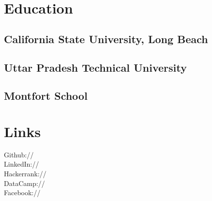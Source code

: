 \documentclass[]{vansh-resume}
\begin{document}


%
%

\begin{minipage}[t]{0.33\textwidth} 


\section{Education} 
\subsection{California State University, Long Beach}
\sectionsep

\subsection{Uttar Pradesh Technical University}
\sectionsep

\subsection{Montfort School}
\sectionsep


\section{Links} 
Github:// \href{https://github.com/vansh2795}{} \\
LinkedIn://  \href{https://www.linkedin.com/in/vansh-bajaj-33a76a146/}{} \\
Hackerrank://  \href{https://www.hackerrank.com/vansh2795}{} \\
DataCamp://  \href{datacamp.com/profile/vanshbajaj}{} \\
Facebook://  \href{https://www.facebook.com/vansh.bajaj.58}{}
\sectionsep


\end{minipage}
\end{document}
